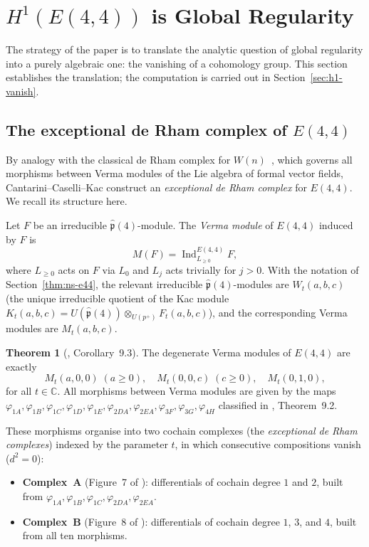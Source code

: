 \documentclass[reqno,10pt]{amsart}
\theoremstyle{definition}
\newtheorem{theor}[subsubsection]{Theorem}
\def\phat{\hat{\mathfrak{p}}}
\begin{document}
\section{$H^1(E(4,4))$ is Global Regularity}
\label{sec:h1-regularity}

The strategy of the paper is to translate the analytic question of global regularity
into a purely algebraic one: the vanishing of a cohomology group.  This section
establishes the translation; the computation is carried out in Section~\ref{sec:h1-vanish}.

\subsection{The exceptional de Rham complex of $E(4,4)$}

By analogy with the classical de Rham complex for $W(n)$~\cite{CCK2026},
which governs all morphisms between Verma modules of the Lie algebra of formal
vector fields, Cantarini--Caselli--Kac construct an \emph{exceptional de Rham
complex} for $E(4,4)$.  We recall its structure here.

Let $F$ be an irreducible $\phat(4)$-module.  The \emph{Verma module} of
$E(4,4)$ induced by $F$ is
\[
  M(F) = \operatorname{Ind}_{L_{\geq 0}}^{E(4,4)} F,
\]
where $L_{\geq 0}$ acts on $F$ via $L_0$ and $L_j$ acts trivially for $j>0$.
With the notation of Section~\ref{thm:ns-e44}, the relevant irreducible
$\phat(4)$-modules are $W_t(a,b,c)$ (the unique irreducible quotient of the Kac
module $K_t(a,b,c) = U(\phat(4))\otimes_{U(p^+)} F_t(a,b,c)$), and the
corresponding Verma modules are $M_t(a,b,c)$.

\begin{theor}[{\cite{CCK2026}, Corollary~9.3}]\label{thm:degenerate}
The degenerate Verma modules of $E(4,4)$ are exactly
\[
  M_t(a,0,0)\;(a\geq 0),\quad M_t(0,0,c)\;(c\geq 0),\quad M_t(0,1,0),
\]
for all $t\in\mathbb{C}$.  All morphisms between Verma modules are given by the
maps $\varphi_{1A},\varphi_{1B},\varphi_{1C},\varphi_{1D},\varphi_{1E},
\varphi_{2DA},\varphi_{2EA},\varphi_{3F},\varphi_{3G},\varphi_{4H}$
classified in \cite{CCK2026}, Theorem~9.2.
\end{theor}

These morphisms organise into two cochain complexes (the \emph{exceptional de
Rham complexes}) indexed by the parameter $t$, in which consecutive compositions
vanish ($d^2=0$):

\begin{itemize}
\item \textbf{Complex~A} (Figure~7 of \cite{CCK2026}): differentials of cochain
  degree $1$ and $2$, built from
  $\varphi_{1A},\varphi_{1B},\varphi_{1C},\varphi_{2DA},\varphi_{2EA}$.
\item \textbf{Complex~B} (Figure~8 of \cite{CCK2026}): differentials of cochain
  degree $1$, $3$, and $4$, built from all ten morphisms.
\end{itemize}
\end{document}

